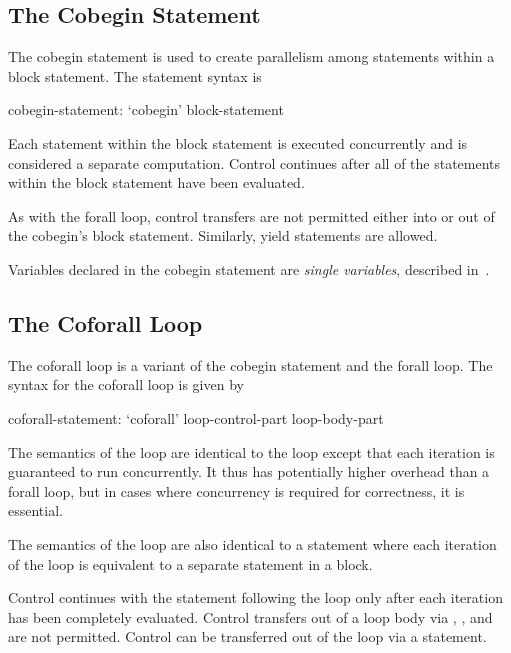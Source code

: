 \subsection{The Cobegin Statement}
\label{Cobegin}

The cobegin statement is used to create parallelism among statements
within a block statement. The  statement syntax is
\begin{syntax}
cobegin-statement:
  `cobegin' block-statement
\end{syntax}
Each statement within the block statement is executed concurrently and
is considered a separate computation.  Control continues after all of
the statements within the block statement have been evaluated.

As with the forall loop, control transfers are not permitted
either into or out of the cobegin's block statement. Similarly,
yield statements are allowed.

Variables declared in the cobegin statement are {\em single variables},
described in~.

\subsection{The Coforall Loop}
\label{Coforall}

The coforall loop is a variant of the cobegin statement and the forall
loop.  The syntax for the coforall loop is given by
\begin{syntax}
coforall-statement:
   `coforall' loop-control-part loop-body-part
\end{syntax}

The semantics of the  loop are identical to
the  loop except that each iteration is guaranteed to run
concurrently.  It thus has potentially higher overhead than a forall
loop, but in cases where concurrency is required for correctness, it
is essential.

The semantics of the  loop are also identical to
a  statement where each iteration of the 
loop is equivalent to a separate statement in a  block.

Control continues with the statement following the 
loop only after each iteration has been completely evaluated.  Control
transfers out of a loop body via , ,
and  are not permitted.  Control can be transferred out
of the loop via a  statement.

